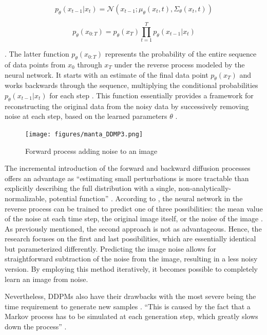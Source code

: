 \[
  p_\theta(x_{t-1} | x_t) = \mathcal{N}(x_{t-1}; \mu_\theta(x_t, t), \Sigma_\theta(x_t, t))
\] 

\[p_\theta(x_{0:T}) = p_\theta(x_{T}) \prod_{t=1}^T p_\theta(x_{t-1} | x_t) \]

\citep{martinez2023understanding}. The latter function \( p_\theta(x_{0:T}) \) represents the probability of the entire sequence of data points from \( x_0 \) through \( x_T \) under the reverse process modeled by the neural network. It starts with an estimate of the final data point \( p_\theta(x_{T}) \) and works backwards through the sequence, multiplying the conditional probabilities \( p_\theta(x_{t-1} | x_t) \) for each step \citep{hoDDPMs,martinez2023understanding}. This function essentially provides a framework for reconstructing the original data from the noisy data by successively removing noise at each step, based on the learned parameters \( \theta \) \citep{yangdiffusionSummary}.


\begin{figure}[ht]
  \centering
    \texttt{[image: figures/manta\_DDMP3.png]}
    \caption{Forward process adding noise to an image}\label{fig:figureReverseProcess}
\end{figure}


The incremental introduction of the forward and backward diffusion processes offers an advantage as ``estimating small perturbations is more tractable than explicitly describing the full distribution with a single, non-analytically-normalizable, potential function'' \citep{sohlDDPM}.
According to \citep{hoDDPMs}, the neural network in the reverse process can be trained to predict one of three possibilities: the mean value of the noise at each time step, the original image itself, or the noise of the image \citep{hoDDPMs}. As previously mentioned, the second approach is not as advantageous. Hence, the research focuses on the first and last possibilities, which are essentially identical but parameterized differently. Predicting the image noise allows for straightforward subtraction of the noise from the image, resulting in a less noisy version. By employing this method iteratively, it becomes possible to completely learn an image from noise.

Nevertheless, DDPMs also have their drawbacks with the most severe being the time requirement to generate new samples \citep{xiao2022tackling}. ``This is caused by the fact that a Markov process has to be simulated at each generation step, which greatly slows down the process'' \citep{martinez2023understanding}. 

